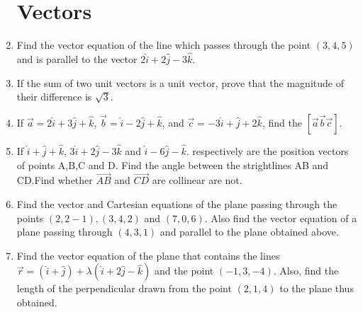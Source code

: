 \documentclass[12pt,-letter paper]{article}
\providecommand{\brak}[1]{\ensuremath{\left(#1\right)}}
\providecommand{\brak}[1]{\ensuremath{\left(#1\right)}}
\begin{document}
\begin{enumerate}
\section{Vectors}
\item Find the vector equation of the line which passes through the point $\brak{3, 4, 5}$ and is parallel to the vector $2\hat{i} + 2\hat{j} - 3\hat{k}$.
\item If the sum of two unit vectors is a unit vector, prove that the magnitude of their difference is $\sqrt{3}$.
\item If $\overrightarrow{a} = 2\hat{i} + 3\hat{j} + \hat{k}$, $\overrightarrow{b} = \hat{i} - 2\hat{j} + \hat{k}$, and $\overrightarrow{c} = -3\hat{i} + \hat{j} + 2\hat{k}$, find the ${[\overrightarrow{a}\overrightarrow{b}\overrightarrow{c}]}$.
\item If $\hat{i}+\hat{j}+\hat{k}$, $3\hat{i}+2\hat{j}-3\hat{k}$ and $\hat{i}-6\hat{j}-\hat{k}$. respectively are the position vectors of points A,B,C and D. Find the angle between the strightlines AB and CD.Find whether $\overrightarrow{AB}$ and $\overrightarrow{CD}$ are collinear are not.
\item Find the vector and Cartesian equations of the plane passing through the points $\brak{2, 2-1},\brak{3, 4, 2}$ and $\brak{7, 0, 6}$. Also find the vector equation of a plane passing through $\brak{4, 3, 1}$ and parallel to the plane obtained above.
\item Find the vector equation of the plane that contains the lines $\overrightarrow{r} = \brak{\hat{i} + \hat{j}} + \lambda\brak{\hat{i} + 2\hat{j} - \hat{k}}$ and the point $\brak{-1, 3, -4}$. Also, find the length of the perpendicular drawn from the point $\brak{2, 1, 4}$ to the plane thus obtained.

\end{enumerate}
\end{document}
